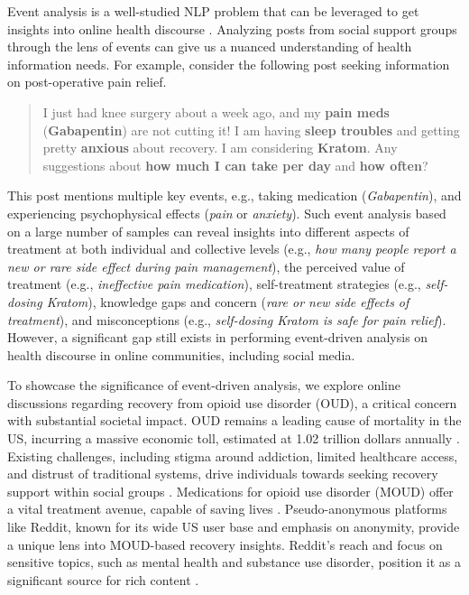 \documentclass[letterpaper]{article}
\begin{document}
Event analysis is a well-studied NLP problem that can be leveraged to get insights into online health discourse \cite{ma-etal-2023-dice, naik-etal-2017-extracting}. Analyzing posts from social support groups through the lens of events can give us a nuanced understanding of health information needs. For example, consider the following post seeking information on post-operative pain relief.


\begin{quote}
I just had knee surgery about a week ago, and my \textbf{pain meds }(\textbf{Gabapentin}) are not cutting it! I am having \textbf{sleep troubles} and getting pretty \textbf{anxious} about recovery. I am considering \textbf{Kratom}. Any suggestions about \textbf{how much I can take per day} and \textbf{how often}?
\end{quote}
This post mentions multiple key events, e.g., taking medication (\textit{Gabapentin}), and experiencing psychophysical effects (\textit{pain} or \textit{anxiety}). Such event analysis based on a large number of samples can reveal insights into different aspects of treatment at both individual and collective levels (e.g., \textit{how many people report a new or rare side effect during pain management}), the perceived value of treatment (e.g., \textit{ineffective pain medication}),  self-treatment strategies (e.g., \textit{self-dosing Kratom}), knowledge gaps and concern (\textit{rare or new side effects of treatment}), and misconceptions (e.g., \textit{self-dosing Kratom is safe for pain relief}). However, a significant gap still exists in performing event-driven analysis on health discourse in online communities, including social media.




To showcase the significance of event-driven analysis, we explore online discussions regarding recovery from opioid use disorder (OUD), a critical concern with substantial societal impact. OUD remains a leading cause of mortality in the US, incurring a massive economic toll, estimated at 1.02 trillion dollars annually \cite{FLORENCE2021108350}. Existing challenges, including stigma around addiction, limited healthcare access, and distrust of traditional systems, drive individuals towards seeking recovery support within social groups \cite{10.1001/jama.2014.2147}. Medications for opioid use disorder (MOUD) offer a vital treatment avenue, capable of saving lives \cite{mooney2020patient}. Pseudo-anonymous platforms like Reddit, known for its wide US user base and emphasis on anonymity, provide a unique lens into MOUD-based recovery insights. Reddit's reach and focus on sensitive topics, such as mental health and substance use disorder, position it as a significant source for rich content \cite{romano2023themedriven, 10.1145/3359249,sharma2020engagement}.
\end{document}

